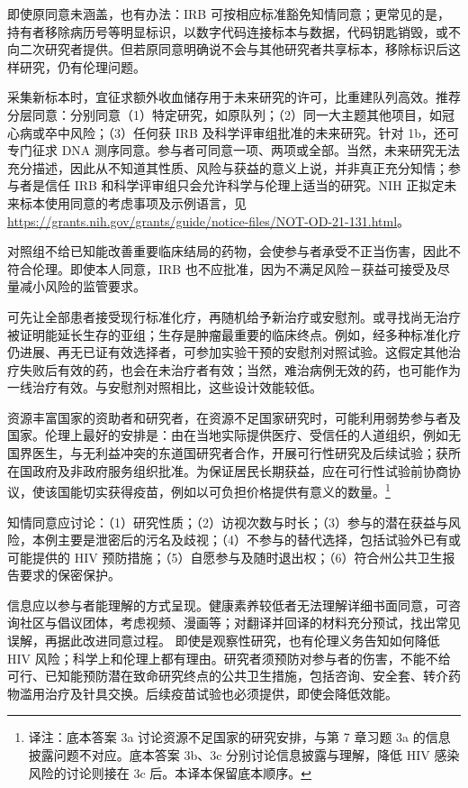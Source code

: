 \begin{answerlist}
即使原同意未涵盖，也有办法：IRB 可按相应标准豁免知情同意；更常见的是，持有者移除病历号等明显标识，以数字代码连接标本与数据，代码钥匙销毁，或不向二次研究者提供。但若原同意明确说不会与其他研究者共享标本，移除标识后这样研究，仍有伦理问题。
\item[1c.] 采集新标本时，宜征求额外收血储存用于未来研究的许可，比重建队列高效。推荐分层同意：分别同意（1）特定研究，如原队列；（2）同一大主题其他项目，如冠心病或卒中风险；（3）任何获 IRB 及科学评审组批准的未来研究。针对 1b，还可专门征求 DNA 测序同意。参与者可同意一项、两项或全部。当然，未来研究无法充分描述，因此从不知道其性质、风险与获益的意义上说，并非真正充分知情；参与者是信任 IRB 和科学评审组只会允许科学与伦理上适当的研究。NIH 正拟定未来标本使用同意的考虑事项及示例语言，见 \url{https://grants.nih.gov/grants/guide/notice-files/NOT-OD-21-131.html}。
\item[2a.] 对照组不给已知能改善重要临床结局的药物，会使参与者承受不正当伤害，因此不符合伦理。即使本人同意，IRB 也不应批准，因为不满足风险－获益可接受及尽量减小风险的监管要求。
\item[2b.] 可先让全部患者接受现行标准化疗，再随机给予新治疗或安慰剂。或寻找尚无治疗被证明能延长生存的亚组；生存是肿瘤最重要的临床终点。例如，经多种标准化疗仍进展、再无已证有效选择者，可参加实验干预的安慰剂对照试验。这假定其他治疗失败后有效的药，也会在未治疗者有效；当然，难治病例无效的药，也可能作为一线治疗有效。与安慰剂对照相比，这些设计效能较低。
\item[3a.] 资源丰富国家的资助者和研究者，在资源不足国家研究时，可能利用弱势参与者及国家。伦理上最好的安排是：由在当地实际提供医疗、受信任的人道组织，例如无国界医生，与无利益冲突的东道国研究者合作，开展可行性研究及后续试验；获所在国政府及非政府服务组织批准。为保证居民长期获益，应在可行性试验前协商协议，使该国能切实获得疫苗，例如以可负担价格提供有意义的数量。\footnote{译注：底本答案 3a 讨论资源不足国家的研究安排，与第 7 章习题 3a 的信息披露问题不对应。底本答案 3b、3c 分别讨论信息披露与理解，降低 HIV 感染风险的讨论则接在 3c 后。本译本保留底本顺序。}
\item[3b.] 知情同意应讨论：（1）研究性质；（2）访视次数与时长；（3）参与的潜在获益与风险，本例主要是泄密后的污名及歧视；（4）不参与的替代选择，包括试验外已有或可能提供的 HIV 预防措施；（5）自愿参与及随时退出权；（6）符合州公共卫生报告要求的保密保护。
\item[3c.] 信息应以参与者能理解的方式呈现。健康素养较低者无法理解详细书面同意，可咨询社区与倡议团体，考虑视频、漫画等；对翻译并回译的材料充分预试，找出常见误解，再据此改进同意过程。
即使是观察性研究，也有伦理义务告知如何降低 HIV 风险；科学上和伦理上都有理由。研究者须预防对参与者的伤害，不能不给可行、已知能预防潜在致命研究终点的公共卫生措施，包括咨询、安全套、转介药物滥用治疗及针具交换。后续疫苗试验也必须提供，即使会降低效能。
\end{answerlist}

